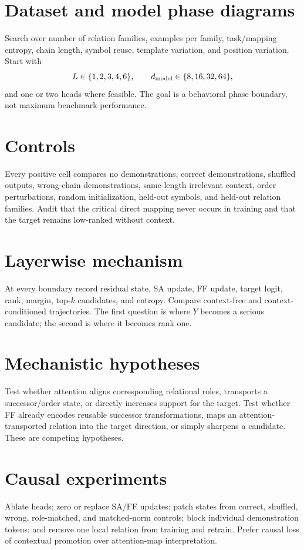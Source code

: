 \documentclass[10pt]{article}
\begin{document}
\section{Dataset and model phase diagrams}
Search over number of relation families, examples per family, task/mapping entropy, chain length, symbol reuse, template variation, and position variation. Start with
\[
L\in\{1,2,3,4,6\},\qquad d_{\rm model}\in\{8,16,32,64\},
\]
and one or two heads where feasible. The goal is a behavioral phase boundary, not maximum benchmark performance.

\section{Controls}
Every positive cell compares no demonstrations, correct demonstrations, shuffled outputs, wrong-chain demonstrations, same-length irrelevant context, order perturbations, random initialization, held-out symbols, and held-out relation families. Audit that the critical direct mapping never occurs in training and that the target remains low-ranked without context.

\section{Layerwise mechanism}
At every boundary record residual state, SA update, FF update, target logit, rank, margin, top-$k$ candidates, and entropy. Compare context-free and context-conditioned trajectories. The first question is where \(Y\) becomes a serious candidate; the second is where it becomes rank one.

\section{Mechanistic hypotheses}
Test whether attention aligns corresponding relational roles, transports a successor/order state, or directly increases support for the target. Test whether FF already encodes reusable successor transformations, maps an attention-transported relation into the target direction, or simply sharpens a candidate. These are competing hypotheses.

\section{Causal experiments}
Ablate heads; zero or replace SA/FF updates; patch states from correct, shuffled, wrong, role-matched, and matched-norm controls; block individual demonstration tokens; and remove one local relation from training and retrain. Prefer causal loss of contextual promotion over attention-map interpretation.
\end{document}
